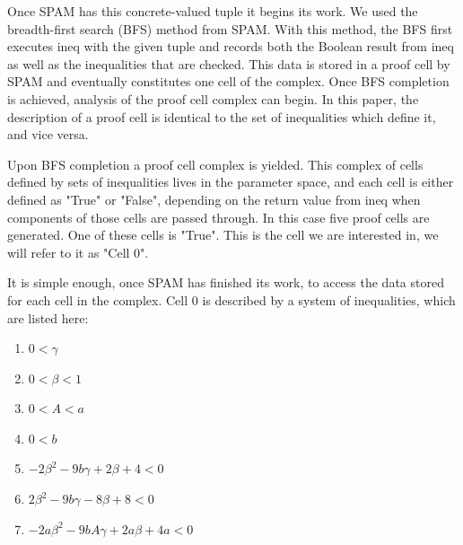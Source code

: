 \documentclass{article}
\begin{document}
Once SPAM has this concrete-valued tuple it begins its work. We used the breadth-first search (BFS) method from SPAM. With this method, the BFS first executes ineq with the given tuple and records both the Boolean result from ineq as well as the inequalities that are checked. This data is stored in a proof cell by SPAM and eventually constitutes one cell of the complex. Once BFS completion is achieved, analysis of the proof cell complex can begin. In this paper, the description of a proof cell is identical to the set of inequalities which define it, and vice versa.

Upon BFS completion a proof cell complex is yielded. This complex of cells defined by sets of inequalities lives in the parameter space, and each cell is either defined as "True" or "False", depending on the return value from ineq when components of those cells are passed through. In this case five proof cells are generated. One of these cells is "True". This is the cell we are interested in, we will refer to it as "Cell 0".

It is simple enough, once SPAM has finished its work, to access the data stored for each cell in the complex. Cell 0 is described by a system of inequalities, which are listed here:
\begin{enumerate}
\item$0 < \gamma$
\item$0 < \beta < 1$
\item$0 < A < a$
\item$0 < b$
\item$-2\beta^{2} - 9b\gamma + 2\beta + 4 < 0$
\item$2\beta^{2} - 9b\gamma - 8\beta + 8 < 0$
\item$-2a\beta^{2} -9bA\gamma + 2a\beta +4a < 0$
\end{enumerate}
\end{document}
